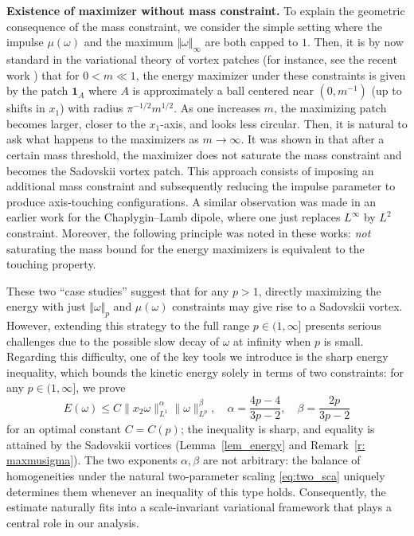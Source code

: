 \documentclass[11pt]{amsart}
\theoremstyle{definition}
\theoremstyle{definition}
\numberwithin{equation}{section}
\newcommand{\nrm}[1]{\Vert#1\Vert}
\newcommand{\0}{\emptyset}
\newcommand{\omg}{\omega}
\begin{document}
	
	\noindent\textbf{Existence of maximizer without mass constraint.}
	To explain the geometric consequence of the mass constraint, we consider the simple setting where the impulse $\mu(\omg)$ and the maximum $\nrm{\omg}_{\infty}$ are both capped to $1$.
	Then, it is
    by now standard in the variational theory of vortex patches (for instance, see the recent work \cite{CQZZ2025})
    that for $0< m \ll 1$, the energy maximizer under these constraints is given by the patch $\mathbf{1}_{A}$ where $A$ is approximately a ball centered near $(0,m^{-1})$ (up to shifts in $x_{1}$) with radius $\pi^{-1/2}m^{1/2}$.
	As one increases $m$, the maximizing patch becomes larger, closer to the $x_{1}$-axis, and looks less circular.
	Then, it is natural to ask what happens to the maximizers as $m\to\infty$. It was shown in \cite{CJS2025} that after a certain mass threshold, the maximizer does not saturate the mass constraint and becomes the Sadovskii vortex patch. This approach consists of imposing an additional mass constraint and subsequently reducing the impulse parameter to produce axis-touching configurations. 
	A similar observation was made in an earlier work \cite{AC2022} for the Chaplygin--Lamb dipole, where one just replaces $L^\infty$ by $L^2$ constraint.
	Moreover, the following principle was noted in these works: \textit{not} saturating the mass bound for the energy maximizers is equivalent to the touching property. 
	\medskip
	
	\noindent 
	These two ``case studies'' suggest that for any $p > 1$, directly maximizing the energy with just $\nrm{\omg}_{p}$ and $\mu(\omg)$ constraints may give  rise to a Sadovskii vortex.
    However, extending this strategy to the full range $p \in (1,\infty]$ presents serious challenges due to the possible slow decay of $\omega$ at infinity when $p$ is small.
	Regarding this difficulty, one of the key tools we introduce is the sharp energy inequality, which bounds the kinetic energy solely in terms of two constraints: for any $p \in (1,\infty]$, we prove 
	\begin{equation}
		\label{eq_intro_energy}
		E(\omega) \le C \|x_2\omega\|_{L^1}^{\alpha}\|\omega \|_{L^p}^{\beta},\quad \alpha=\frac{4p-4}{3p-2},\quad \beta=\frac{2p}{3p-2}
	\end{equation}
	for an optimal constant $C=C(p)$; the inequality is sharp, and equality is attained by the Sadovskii vortices (Lemma~\ref{lem_energy} and Remark~\ref{r: maxmusigma}).
    The two exponents $\alpha, \beta$ are not arbitrary: the balance of homogeneities under the natural two-parameter scaling \eqref{eq:two_sca} uniquely determines them whenever an inequality of this type holds. Consequently, the estimate naturally fits into a scale-invariant variational framework that plays a central role in our analysis.
    \medskip
	
\end{document}
